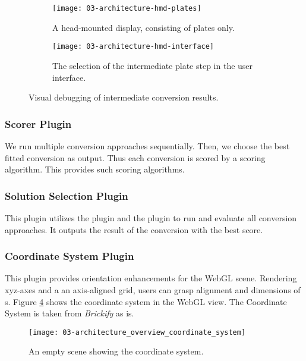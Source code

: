 \documentclass[../../ClassicThesis.tex]{subfiles}
\begin{document}
\begin{figure}[h]
  \centering
  \begin{subfigure}[a]{0.48\textwidth}
    \texttt{[image: 03-architecture-hmd-plates]}
    \caption{A head-mounted display, consisting of plates only.}
    \label{fig:steps:plate}
  \end{subfigure}
  \begin{subfigure}[b]{0.48\textwidth}
    \texttt{[image: 03-architecture-hmd-interface]}
    \caption{The selection of the intermediate plate step in
      the user interface.}
    \label{fig:steps:ui}
  \end{subfigure}
  \label{fig:steps}
  \caption{Visual debugging of intermediate conversion results.}
\end{figure}

\subsubsection{Scorer Plugin}

We run multiple conversion approaches sequentially. Then, we choose
the best fitted conversion as output. Thus each conversion
is scored by a scoring algorithm. This
 provides such scoring algorithms.

\subsubsection{Solution Selection Plugin}

This plugin utilizes the  plugin and
the  plugin to run and evaluate all conversion
approaches. It outputs the result of the conversion with the
best score.

\subsubsection{Coordinate System Plugin}

This plugin provides orientation enhancements for the WebGL
scene. Rendering xyz-axes and a an axis-aligned grid, users
can grasp alignment and dimensions of {\threedmodel}s.
Figure \ref{fig:architecture_overview_coordinate_system}
shows the coordinate system in the WebGL view. The
Coordinate System is taken from \emph{Brickify} as
is\cite[p.~92]{bachelor-thesis}.

\begin{figure}
  \texttt{[image: 03-architecture\_overview\_coordinate\_system]}
  \caption{An empty scene showing the coordinate system.}
  \label{fig:architecture_overview_coordinate_system}
\end{figure}
\end{document}
